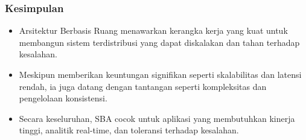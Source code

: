 \documentclass[aspectratio=169, table]{beamer}
\begin{document}
    \begin{frame}
        \frametitle{Kesimpulan}
        \begin{itemize}
            \item Arsitektur Berbasis Ruang menawarkan kerangka kerja yang kuat untuk membangun sistem terdistribusi yang dapat diskalakan dan tahan terhadap kesalahan.
            \item Meskipun memberikan keuntungan signifikan seperti skalabilitas dan latensi rendah, ia juga datang dengan tantangan seperti kompleksitas dan pengelolaan konsistensi.
            \item Secara keseluruhan, SBA cocok untuk aplikasi yang membutuhkan kinerja tinggi, analitik real-time, dan toleransi terhadap kesalahan.
        \end{itemize}
    \end{frame}
\end{document}
